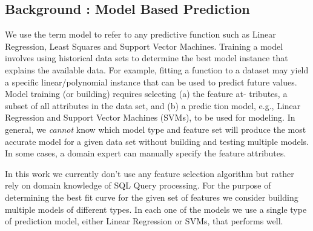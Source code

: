 \documentclass{article}
\begin{document}
\begin{multicols}{2}
	\section{Background : Model Based Prediction}	
	We use the term model to refer to any predictive function such as
	Linear Regression, Least Squares and Support Vector Machines.
	Training a model involves using historical data sets to determine the
	best model instance that explains the available data. For example,
	fitting a function to a dataset may yield a specific linear/polynomial
	instance that can be used to predict future values.
	Model training (or building) requires selecting (a) the feature at-
	tributes, a subset of all attributes in the data set, and (b) a predic
	tion model, e.g., Linear Regression and Support Vector Machines
	(SVMs), to be used for modeling. In general, we \textit{cannot} know
	which model type and feature set will produce the most accurate
	model for a given data set without building and testing multiple
	models. In some cases, a domain expert can manually specify the
	feature attributes. 

	In this work we currently don't use any feature selection algorithm but rather rely on domain 
knowledge of SQL Query processing. For the purpose of determining the best fit curve for the given set of features we consider building multiple models of different types. In each one of the models we use a single type of prediction model, either Linear Regression or SVMs, that performs well.


\end{multicols}
\end{document}
